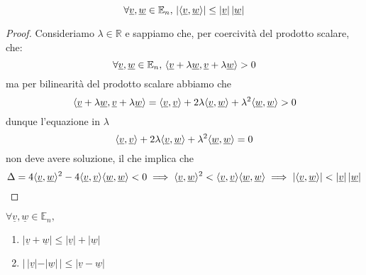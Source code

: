 \begin{prop}
$$\forall \underline{v}, \underline{w} \in \mathbb{E}_n, \, | \langle \underline{v}, \underline{w} \rangle | \leq |\underline{v}| \, |\underline{w}|$$
\label{prop:dis_cs}
\end{prop}
\begin{proof}
Consideriamo $\lambda \in \mathbb{R}$ e sappiamo che, per coercività del prodotto scalare, che:
$$
\forall \underline{v}, \underline{w} \in \mathbb{E}_n, \, \langle \underline{v} + \lambda \underline{w}, \underline{v} + \lambda \underline{w} \rangle > 0
$$
ma per bilinearità del prodotto scalare abbiamo che
$$
\langle \underline{v} + \lambda \underline{w}, \underline{v} + \lambda \underline{w} \rangle = \langle \underline{v}, \underline{v} \rangle + 2\lambda \langle \underline{v}, \underline{w} \rangle + \lambda^2 \langle \underline{w}, \underline{w} \rangle> 0
$$
dunque l'equazione in $\lambda$
$$
\langle \underline{v}, \underline{v} \rangle + 2\lambda \langle \underline{v}, \underline{w} \rangle + \lambda^2 \langle \underline{w}, \underline{w} \rangle = 0
$$
non deve avere soluzione, il che implica che
$$
\Delta = 4\langle \underline{v}, \underline{w} \rangle^2 - 4 \langle \underline{v}, \underline{v} \rangle \langle \underline{w}, \underline{w} \rangle < 0 \implies \langle \underline{v}, \underline{w} \rangle^2 < \langle \underline{v}, \underline{v} \rangle \langle \underline{w}, \underline{w} \rangle \implies |\langle \underline{v}, \underline{w} \rangle| < |\underline{v}| \, |\underline{w}|
$$
\end{proof}
\begin{prop} $\forall \underline{v}, \underline{w} \in \mathbb{E}_n, $
\begin{enumerate}[label=\protect\circled{\arabic*}]
	\item $|\underline{v} + \underline{w}| \leq |\underline{v}| + |\underline{w}|$
	\item $| \, |\underline{v}| - |\underline{w}| \, | \leq |\underline{v} - \underline{w}|$
\end{enumerate}
\label{prop:dis_triang}
\end{prop}
